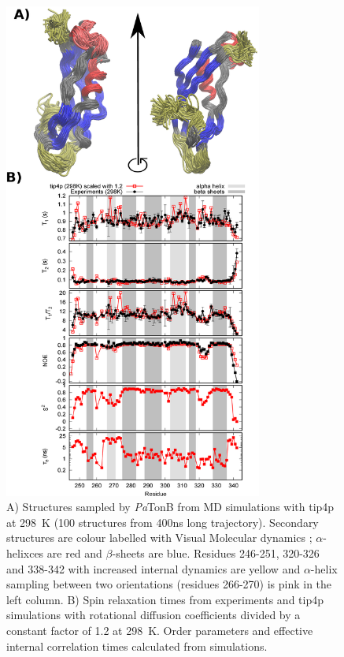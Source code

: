 \documentclass[pre,aps,floatfix,authordate1-4,twocolumn]{revtex4-1}
\begin{document}
\begin{figure}[!h]
  \includegraphics[width=8.5cm]{../Figs/RELdataPsTonB2.eps}%
  \caption{A) Structures sampled by {\it Pa}TonB from MD simulations with tip4p at 298~K
    (100 structures from 400ns long trajectory). Secondary structures
    are colour labelled with Visual Molecular dynamics \cite{frishman95,humphrey96};
    $\alpha$-helixces are red and $\beta$-sheets are blue.
    Residues 246-251, 320-326 and 338-342 with increased internal dynamics are yellow and
    $\alpha$-helix sampling between two orientations (residues 266-270) is pink in the left column.
    B) Spin relaxation times from experiments and tip4p
    simulations with rotational diffusion coefficients divided by a
    constant factor of 1.2 at 298~K. Order parameters and effective internal correlation
    times calculated from simulations. \label{PsTonBrelaxationDATAscaled}}%
\end{figure}
\end{document}
